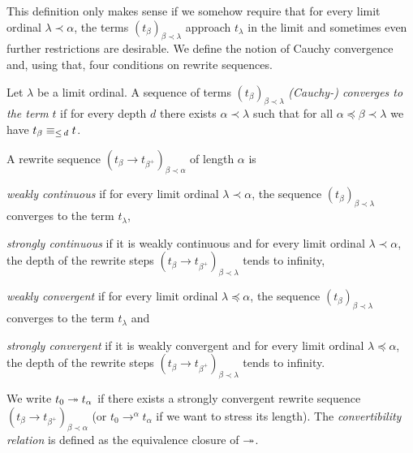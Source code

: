 This definition only makes sense if we somehow require that for every limit
ordinal $\lambda \prec \alpha$, the terms $(t_\beta)_{\beta \prec
  \lambda}$ approach $t_\lambda$ in the limit and sometimes even
further restrictions are desirable. We define the notion of Cauchy
convergence and, using that, four conditions on rewrite sequences.

\begin{definition}\label{def:cauchy}%
  Let $\lambda$ be a limit ordinal. A sequence of terms
  $(t_\beta)_{\beta \prec \lambda}$ \emph{(Cauchy-) converges to the
    term} $t$ if for every depth $d$ there exists $\alpha \prec
  \lambda$ such that for all $\alpha \preceq \beta \prec \lambda$ we
  have $t_\beta \equiv_{\le \, d} t$.
\end{definition}

\begin{definition}%
A rewrite sequence $(t_\beta \rightarrow t_{\beta^+})_{\beta \prec
  \alpha}$ of length $\alpha$ is
\begin{compactenum}
  \item
    \emph{weakly continuous} if for every limit ordinal $\lambda \prec
    \alpha$, the sequence $(t_\beta)_{\beta \prec \lambda}$ converges
    to the term $t_\lambda$,
  \item
    \emph{strongly continuous} if it is weakly continuous and for every limit
    ordinal $\lambda \prec \alpha$, the depth of the rewrite steps $(t_\beta
    \rightarrow t_{\beta^+})_{\beta \prec \lambda}$ tends to infinity,
  \item
    \emph{weakly convergent} if for every limit ordinal $\lambda
    \preceq \alpha$, the sequence $(t_\beta)_{\beta \prec \lambda}$
    converges to the term $t_\lambda$ and
  \item
    \emph{strongly convergent} if it is weakly convergent and for
    every limit ordinal $\lambda \preceq \alpha$, the depth of the
    rewrite steps $(t_\beta \rightarrow t_{\beta^+})_{\beta \prec
      \lambda}$ tends to infinity.
\end{compactenum}
\end{definition}

We write $t_0 \twoheadrightarrow t_\alpha$ if there exists a strongly
convergent rewrite sequence $(t_\beta \rightarrow t_{\beta^+})_{\beta
  \prec \alpha}$ (or $t_0 \rightarrow^\alpha t_\alpha$ if we want to
stress its length). The \emph{convertibility relation} is defined as
the equivalence closure of $\twoheadrightarrow$.


